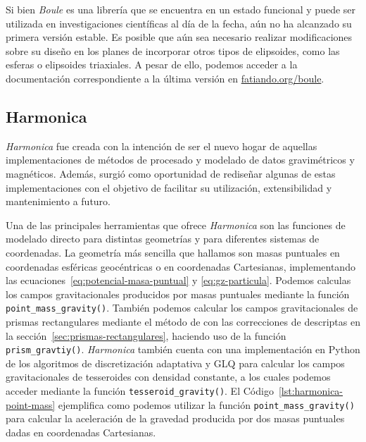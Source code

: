 Si bien \emph{Boule} es una librería que se encuentra en un estado funcional
y puede ser utilizada en investigaciones científicas al día de la fecha, aún no
ha alcanzado su primera versión estable.
Es posible que aún sea necesario realizar modificaciones sobre su diseño en los
planes de incorporar otros tipos de elipsoides, como las esferas o elipsoides
triaxiales.
A pesar de ello, podemos acceder a la documentación correspondiente a la última
versión en \href{https://www.fatiando.org/boule}{fatiando.org/boule}.


\subsection{Harmonica}
\label{sec:harmonica}

\emph{Harmonica} fue creada con la intención de ser el nuevo hogar de aquellas
implementaciones de métodos de procesado y modelado de datos gravimétricos
y magnéticos.
Además, surgió como oportunidad de rediseñar algunas de estas implementaciones
con el objetivo de facilitar su utilización, extensibilidad y mantenimiento
a futuro.

Una de las principales herramientas que ofrece \emph{Harmonica} son las
funciones de modelado directo para distintas geometrías y para diferentes
sistemas de coordenadas.
La geometría más sencilla que hallamos son masas puntuales en coordenadas
esféricas geocéntricas o en coordenadas Cartesianas, implementando las
ecuaciones~\ref{eq:potencial-masa-puntual} y \ref{eq:gz-particula}.
Podemos calculas los campos gravitacionales producidos por masas puntuales
mediante la función \texttt{point\_mass\_gravity()}.
También podemos calcular los campos gravitacionales de prismas rectangulares
mediante el método de \citet{nagy2000} con las correcciones de
\citet{fukushima2020} descriptas en la sección~\ref{sec:prismas-rectangulares},
haciendo uso de la función \texttt{prism\_gravtiy()}.
\emph{Harmonica} también cuenta con una implementación en Python de los
algoritmos de discretización adaptativa y \ac{GLQ} para calcular los campos
gravitacionales de tesseroides con densidad constante, a los cuales podemos
acceder mediante la función \texttt{tesseroid\_gravity()}.
El Código~\ref{lst:harmonica-point-mass} ejemplifica como podemos utilizar la
función \texttt{point\_mass\_gravity()} para calcular la aceleración de la
gravedad producida por dos masas puntuales dadas en coordenadas Cartesianas.




